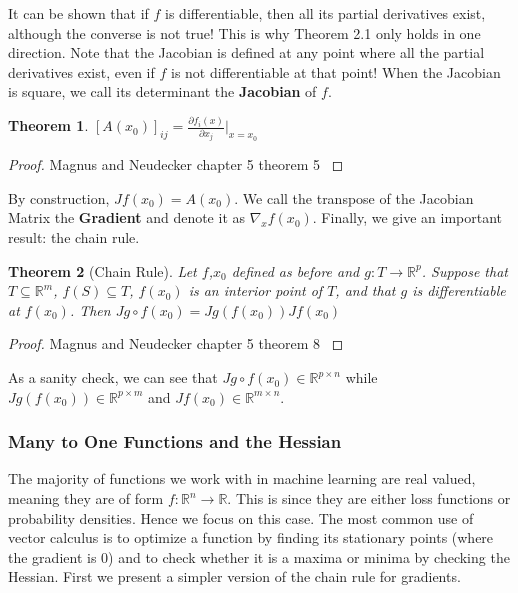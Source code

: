 \documentclass[]{article}
\theoremstyle{mattstyle}
\newtheorem{theorem}{Theorem}[section]
\theoremstyle{definition}
\begin{document}
It can be shown that if $f$ is differentiable, then all its partial derivatives exist, although the converse is not true! This is why Theorem 2.1 only holds in one direction. Note that the Jacobian is defined at any point where all the partial derivatives exist, even if $f$ is not differentiable at that point! When the Jacobian is square, we call its determinant the \textbf{Jacobian} of $f$.

\begin{theorem}
	$[A(x_0)]_{ij} = \frac{\partial f_i(x)}{\partial x_j}\Bigr\rvert_{x=x_{0}}$
\end{theorem} 
\begin{proof}
	Magnus and Neudecker chapter 5 theorem 5 \cite{magnus1988matrix}
\end{proof}

By construction, $Jf(x_0) = A(x_0)$. We call the transpose of the Jacobian Matrix the \textbf{Gradient} and denote it as $\nabla_x f(x_0)$. Finally, we give an important result: the chain rule.
\begin{theorem}[Chain Rule]
	Let $f$,$x_0$ defined as before and $g: T \rightarrow \mathbb{R}^p$. Suppose that $T \subseteq \mathbb{R}^m$, $f(S) \subseteq T$, $f(x_0)$ is an interior point of $T$, and that $g$ is differentiable at $f(x_0)$. Then $Jg \circ f(x_0) = Jg(f(x_0))Jf(x_0)$
\end{theorem} 
\begin{proof}
	Magnus and Neudecker chapter 5 theorem 8 \cite{magnus1988matrix}
\end{proof}

As a sanity check, we can see that $Jg \circ f(x_0) \in \mathbb{R}^{p \times n}$ while  $Jg(f(x_0))\in \mathbb{R}^{p \times m}$ and $Jf(x_0)\in \mathbb{R}^{m\times n}$.

\subsubsection{Many to One Functions and the Hessian}

The majority of functions we work with in machine learning are real valued, meaning they are of form $f: \mathbb{R}^n \rightarrow \mathbb{R}$. This is since they are either loss functions or probability densities. Hence we focus on this case. The most common use of vector calculus is to optimize a function by finding its stationary points (where the gradient is 0) and to check whether it is a maxima or minima by checking the Hessian. First we present a simpler version of the chain rule for gradients.
 
\end{document}
